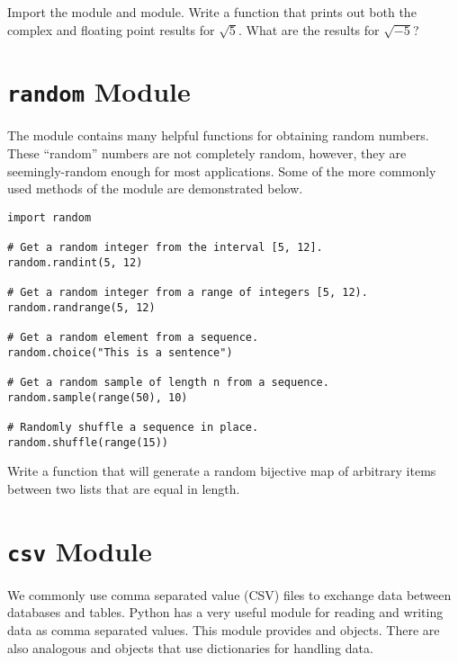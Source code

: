 \begin{problem}
Import the  module and  module. Write a function that prints out both the complex and floating point results for $\sqrt{5}$.  What are the results for $\sqrt{-5}$?
\end{problem}

\section*{\texttt{random} Module}
The  module contains many helpful functions for obtaining random numbers.
These ``random'' numbers are not completely random, however, they are seemingly-random enough for most applications.
Some of the more commonly used methods of the  module are demonstrated below.
\begin{lstlisting}
import random

# Get a random integer from the interval [5, 12].
random.randint(5, 12)

# Get a random integer from a range of integers [5, 12).
random.randrange(5, 12)

# Get a random element from a sequence.
random.choice("This is a sentence")

# Get a random sample of length n from a sequence.
random.sample(range(50), 10)

# Randomly shuffle a sequence in place.
random.shuffle(range(15))
\end{lstlisting}
\begin{comment}
The \li{random} module has functions that can sample from a variety of different statistical distributions such as: uniform, normal, beta, gamma, exponential, etc.
\end{comment}

\begin{problem}
Write a function that will generate a random bijective map of arbitrary items between two lists that are equal in length.
\label{prob:random_map}
\end{problem}

\section*{\texttt{csv} Module}
We commonly use comma separated value (CSV) files to exchange data between databases and tables.
Python has a very useful module for reading and writing data as comma separated values.
This  module provides  and  objects.
There are also analogous  and  objects that use dictionaries for handling data.

